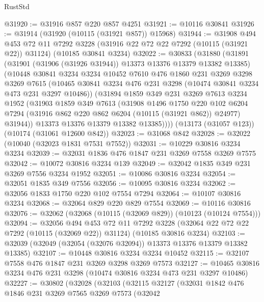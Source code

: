 \begin{lexlean}{RustStd}
\begin{coremodule}
@31920 := @31916 @857 @220 @857 @4251
@31921 := @10116 @30841
@31926 := @31914 (@31920 (@10115 (@31921 @857)) @15968)
@31944 := @31908
    @494
    @453
    @72
    @11
    @7292
    @3228
    (@31916 @22 @72 @22 @7292 (@10115 (@31921 @22)) @31124)
    (@10185 @30841 @3234)
@32022 := @30833
    (@31880
      (@31891
        (@31901 (@31906 (@31926 @31944)) @13373 @13376 @13379 @13382 @13385)
        (@10448
          @30841
          @3234
          @3234
          @10452
          @7610
          @476
          @1860
          @231
          @3269
          @3298
          @3269
          @7615
          (@10465 @30841 @3234 @476 @231 @3298 (@10474 @30841 @3234 @473 @231 @3297 @10486))
          (@31894
            @1859
            @349
            @231
            @3269
            @7613
            @3234
            @1952
            (@31903
              @1859
              @349
              @7613
              (@31908
                @1496
                @1750
                @220
                @102
                @6204
                @7294
                (@31916 @862 @220 @862 @6204 (@10115 (@31921 @862)) @24977)
                @31944))
            @13373
            @13376
            @13379
            @13382
            @13385))))
    (@13173 (@31057 @123))
    (@10174 (@31061 @12600 @842))
@32023 := @31068 @842
@32028 := @32022 (@10040 (@32023 @1831 @7531 @7552))
@32031 := @10229 @30816 @3234 @3234
@32039 := @32031 @1836 @476 @1847 @231 @3269 @7558 @3269 @7575
@32042 := @10072 @30816 @3234 @139
@32049 := @32042 @1835 @349 @231 @3269 @7556 @3234 @1952
@32051 := @10086 @30816 @3234
@32054 := @32051 @1835 @349 @7556
@32056 := @10095 @30816 @3234
@32062 := @32056 @1833 @1750 @220 @102 @7554 @7294
@32064 := @10107 @30816 @3234
@32068 := @32064 @829 @220 @829 @7554
@32069 := @10116 @30816
@32076 := @32062 (@32068 (@10115 (@32069 @829)) (@10123 (@10124 @7554)))
@32094 := @32056
    @494
    @453
    @72
    @11
    @7292
    @3228
    (@32064 @22 @72 @22 @7292 (@10115 (@32069 @22)) @31124)
    (@10185 @30816 @3234)
@32103 := @32039 (@32049 (@32054 (@32076 @32094)) @13373 @13376 @13379 @13382 @13385)
@32107 := @10448 @30816 @3234 @3234 @10452
@32115 := @32107 @7558 @476 @1847 @231 @3269 @3298 @3269 @7573
@32127 := @10465 @30816 @3234 @476 @231 @3298 (@10474 @30816 @3234 @473 @231 @3297 @10486)
@32227 := @30802
    (@32028
      (@32103
        (@32115
          @32127
          (@32031
            @1842
            @476
            @1846
            @231
            @3269
            @7565
            @3269
            @7573
            (@32042

\end{coremodule}
\end{lexlean}
